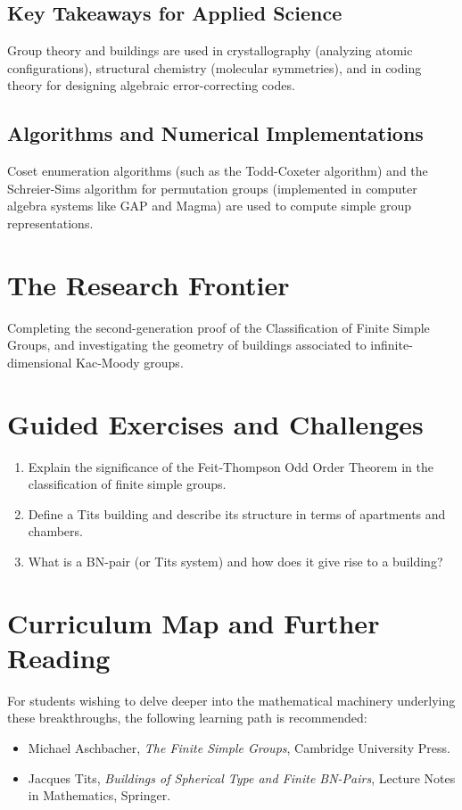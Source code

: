 \subsection{Key Takeaways for Applied Science}
Group theory and buildings are used in crystallography (analyzing atomic configurations), structural chemistry (molecular symmetries), and in coding theory for designing algebraic error-correcting codes.

\subsection{Algorithms and Numerical Implementations}
Coset enumeration algorithms (such as the Todd-Coxeter algorithm) and the Schreier-Sims algorithm for permutation groups (implemented in computer algebra systems like GAP and Magma) are used to compute simple group representations.

\section{The Research Frontier}
Completing the second-generation proof of the Classification of Finite Simple Groups, and investigating the geometry of buildings associated to infinite-dimensional Kac-Moody groups.

\section{Guided Exercises and Challenges}
\begin{enumerate}[label=\textbf{\arabic*.}]
  \item Explain the significance of the Feit-Thompson Odd Order Theorem in the classification of finite simple groups.
  \item Define a Tits building and describe its structure in terms of apartments and chambers.
  \item What is a BN-pair (or Tits system) and how does it give rise to a building?
\end{enumerate}

\section{Curriculum Map and Further Reading}
For students wishing to delve deeper into the mathematical machinery underlying these breakthroughs, the following learning path is recommended:
\begin{itemize}
  \item Michael Aschbacher, \emph{The Finite Simple Groups}, Cambridge University Press.
  \item Jacques Tits, \emph{Buildings of Spherical Type and Finite BN-Pairs}, Lecture Notes in Mathematics, Springer.
\end{itemize}

